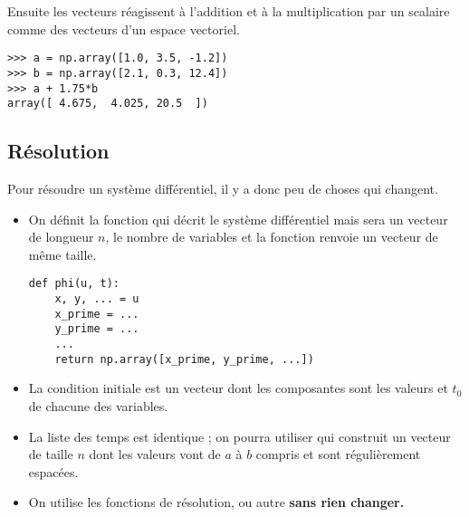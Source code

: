 \medskip

Ensuite les vecteurs réagissent à l'addition et à la multiplication par un scalaire comme des vecteurs d'un espace vectoriel.
\begin{lstlisting}
>>> a = np.array([1.0, 3.5, -1.2])
>>> b = np.array([2.1, 0.3, 12.4])
>>> a + 1.75*b
array([ 4.675,  4.025, 20.5  ])
\end{lstlisting} 
\subsection{Résolution}
Pour résoudre un système différentiel, il y a donc peu de choses qui changent.
\begin{itemize}
\item On définit la fonction qui décrit le système différentiel  mais  sera un vecteur de longueur $n$, le nombre de variables et la fonction renvoie un vecteur de même taille.
\begin{lstlisting}
def phi(u, t):
    x, y, ... = u
    x_prime = ...
    y_prime = ...
    ...
    return np.array([x_prime, y_prime, ...])
\end{lstlisting} 
\item La condition initiale est un vecteur dont les composantes sont les valeurs et $t_0$ de chacune des variables.
\item La liste des temps est identique ; on pourra utiliser  qui construit un vecteur de taille $n$ dont les valeurs vont de $a$ à $b$ compris et sont régulièrement espacées.  
\item On utilise les fonctions de résolution,  ou autre {\bf sans rien changer.}
\end{itemize}
